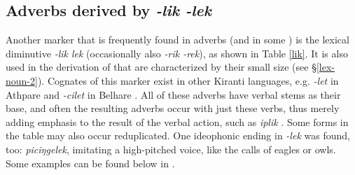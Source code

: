     
\subsection{Adverbs derived by  \emph{-lik \ti -lek}}

Another marker that is frequently found  in adverbs (and in some ) is the lexical diminutive \emph{-lik \ti lek} (occasionally also \emph{-rik \ti -rek}), as shown in Table \ref{lik}. It is also used in the derivation of  that are characterized by their small size (see §\ref{lex-noun-2}). Cognates of this marker exist in other Kiranti languages, e.g. \emph{-let} in Athpare \cite{Ebert1997A-grammar} and \emph{-cilet} in Belhare  \citep{Bickel2003Belhare}. All of these adverbs have verbal stems as their base, and often the resulting adverbs occur with just these verbs, thus merely adding  emphasis to the result of the verbal action, such as \emph{iplik} . Some forms in the table may also occur reduplicated. One ideophonic  ending in \emph{-lek} was found, too: \emph{piciŋgelek}, imitating a high-pitched voice, like the calls of eagles or owls. Some examples can be found below in \Next.



